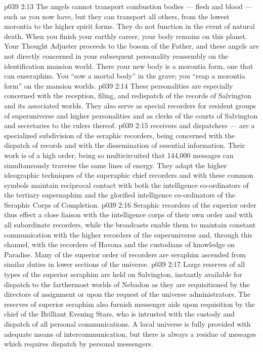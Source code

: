 \vs p039 2:13 \pc The angels cannot transport combustion bodies --- flesh and blood --- such as you now have, but they can transport all others, from the lowest morontia to the higher spirit forms. They do not function in the event of natural death. When you finish your earthly career, your body remains on this planet. Your Thought Adjuster proceeds to the bosom of the Father, and these angels are not directly concerned in your subsequent personality reassembly on the identification mansion world. There your new body is a morontia form, one that can enseraphim. You “sow a mortal body” in the grave; you “reap a morontia form” on the mansion worlds.
\vs p039 2:14 \bibnobreakspace {} These personalities are especially concerned with the reception, filing, and redispatch of the records of Salvington and its associated worlds. They also serve as special recorders for resident groups of superuniverse and higher personalities and as clerks of the courts of Salvington and secretaries to the rulers thereof.
\vs p039 2:15 \pc {} receivers and dispatchers --- are a specialized subdivision of the seraphic recorders, being concerned with the dispatch of records and with the dissemination of essential information. Their work is of a high order, being so multicircuited that 144,000 messages can simultaneously traverse the same lines of energy. They adapt the higher ideographic techniques of the superaphic chief recorders and with these common symbols maintain reciprocal contact with both the intelligence co\hyp{}ordinators of the tertiary supernaphim and the glorified intelligence co\hyp{}ordinators of the Seraphic Corps of Completion.
\vs p039 2:16 Seraphic recorders of the superior order thus effect a close liaison with the intelligence corps of their own order and with all subordinate recorders, while the broadcasts enable them to maintain constant communication with the higher recorders of the superuniverse and, through this channel, with the recorders of Havona and the custodians of knowledge on Paradise. Many of the superior order of recorders are seraphim ascended from similar duties in lower sections of the universe.
\vs p039 2:17 \bibnobreakspace {} Large reserves of all types of the superior seraphim are held on Salvington, instantly available for dispatch to the farthermost worlds of Nebadon as they are requisitioned by the directors of assignment or upon the request of the universe administrators. The reserves of superior seraphim also furnish messenger aids upon requisition by the chief of the Brilliant Evening Stars, who is intrusted with the custody and dispatch of all personal communications. A local universe is fully provided with adequate means of intercommunication, but there is always a residue of messages which requires dispatch by personal messengers.
